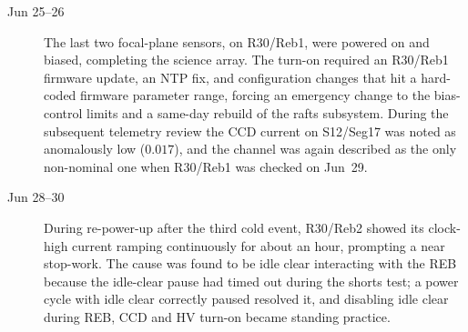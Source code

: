 \begin{description}
\item[Jun 25--26] The last two focal-plane sensors, on R30/Reb1, were
  powered on and biased, completing the science array.  The turn-on
  required an R30/Reb1 firmware update, an NTP fix, and configuration
  changes that hit a hard-coded firmware parameter range, forcing an
  emergency change to the bias-control limits and a same-day rebuild
  of the rafts subsystem.  During the subsequent telemetry review the
  CCD current on S12/Seg17 was noted as anomalously low
  ($0.017$), and the channel was again described as the only
  non-nominal one when R30/Reb1 was checked on Jun~29.

\item[Jun 28--30] During re-power-up after the third cold event,
  R30/Reb2 showed its clock-high current ramping continuously for
  about an hour, prompting a near stop-work.  The cause was found to be
  idle clear interacting with the REB because the idle-clear pause had
  timed out during the shorts test; a power cycle with idle clear
  correctly paused resolved it, and disabling idle clear during REB,
  CCD and HV turn-on became standing practice.
\end{description}

